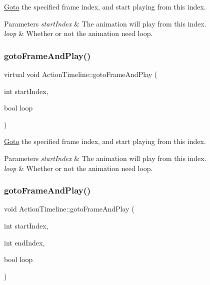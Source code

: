 \hyperlink{classGoto}{Goto} the specified frame index, and start playing from this index. 
\begin{DoxyParams}{Parameters}
{\em start\+Index} & The animation will play from this index. \\
\hline
{\em loop} & Whether or not the animation need loop. \\
\hline
\end{DoxyParams}
\mbox{\label{classActionTimeline_a1b665a45f28035f111924f55566dd17a}} 
\subsubsection{\texorpdfstring{goto\+Frame\+And\+Play()}{gotoFrameAndPlay()}\hspace{0.1cm}{\footnotesize\ttfamily [4/8]}}
{\footnotesize\ttfamily virtual void Action\+Timeline\+::goto\+Frame\+And\+Play (\begin{DoxyParamCaption}\item[{int}]{start\+Index,  }\item[{bool}]{loop }\end{DoxyParamCaption})\hspace{0.3cm}{\ttfamily [virtual]}}

\hyperlink{classGoto}{Goto} the specified frame index, and start playing from this index. 
\begin{DoxyParams}{Parameters}
{\em start\+Index} & The animation will play from this index. \\
\hline
{\em loop} & Whether or not the animation need loop. \\
\hline
\end{DoxyParams}
\mbox{\label{classActionTimeline_a58d78a5ff4ec42ffa5479d6e78b022f4}} 
\subsubsection{\texorpdfstring{goto\+Frame\+And\+Play()}{gotoFrameAndPlay()}\hspace{0.1cm}{\footnotesize\ttfamily [5/8]}}
{\footnotesize\ttfamily void Action\+Timeline\+::goto\+Frame\+And\+Play (\begin{DoxyParamCaption}\item[{int}]{start\+Index,  }\item[{int}]{end\+Index,  }\item[{bool}]{loop }\end{DoxyParamCaption})\hspace{0.3cm}{\ttfamily [virtual]}}

